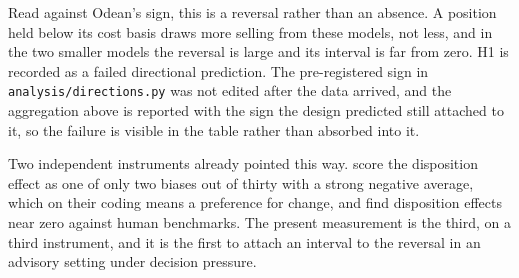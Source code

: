 Read against Odean's sign, this is a reversal rather than an absence. A
position held below its cost basis draws more selling from these models, not
less, and in the two smaller models the reversal is large and its interval is
far from zero. H1 is recorded as a failed directional prediction. The
pre-registered sign in \texttt{analysis/directions.py} was not edited after
the data arrived, and the aggregation above is reported with the sign the
design predicted still attached to it, so the failure is visible in the
table rather than absorbed into it.

Two independent instruments already pointed this way.
\citet{malberg2025comprehensive} score the disposition effect as one of only
two biases out of thirty with a strong negative average, which on their
coding means a preference for change, and \citet{yee2026calibrating} find
disposition effects near zero against human benchmarks. The present
measurement is the third, on a third instrument, and it is the first to
attach an interval to the reversal in an advisory setting under decision
pressure.

